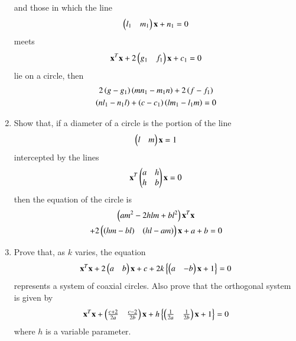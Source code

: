 \begin{enumerate}[label=\arabic*.,ref=\thesubsection.\theenumi]
 and those in which the line 
 \begin{align}
\begin{pmatrix}l_1 & m_1\end{pmatrix}\mathbf{x}+n_1=0
 \end{align}
 meets 
 \begin{align}
\mathbf{x}^T\mathbf{x}+2\begin{pmatrix}g_1 & f_1\end{pmatrix}\mathbf{x}+c_1 = 0
 \end{align}
lie on a circle,
 then 
 \begin{multline}
 2\left(g-g_1\right)\left(mn_1-m_1n\right)+2\left(f-f_1\right)
 \\
 \left(nl_1-n_1l\right)+\left(c-c_1\right)\left(lm_1-l_1m\right)=0
 \end{multline}
 \item Show that, if a diameter of a circle is the portion of the line 
 \begin{align}
\begin{pmatrix}l & m\end{pmatrix}\mathbf{x}=1
 \end{align}
intercepted by the lines 
 \begin{align}
\mathbf{x}^T\begin{pmatrix}a & h\\h & b\end{pmatrix}\mathbf{x} = 0
 \end{align}
 then the 
 equation of the circle is
 \begin{multline}
\left(am^2-2hlm+bl^2\right)\mathbf{x}^T\mathbf{x}
\\
+2\begin{pmatrix}\left(hm-bl\right) & \left(hl-am\right)\end{pmatrix}\mathbf{x}+ a+b = 0
 \end{multline}
\item Prove that, as $k$ varies, the equation
 \begin{align}
\mathbf{x}^T\mathbf{x}+2\begin{pmatrix}a & b\end{pmatrix}\mathbf{x}+c + 2k\left\{\begin{pmatrix}a & -b\end{pmatrix}\mathbf{x}+1\right\}= 0
 \end{align}
 represents a system of coaxial circles.  Also prove that the orthogonal system is given by
 \begin{align}
\mathbf{x}^T\mathbf{x}+\begin{pmatrix}\frac{c+2}{2a} & \frac{c-2}{2b}\end{pmatrix}\mathbf{x}+h\left\{\begin{pmatrix}\frac{1}{2a}&\frac{1}{2b}\end{pmatrix}\mathbf{x} + 1\right\} = 0
 \end{align}
 where $h$ is a variable parameter.
\end{enumerate}
